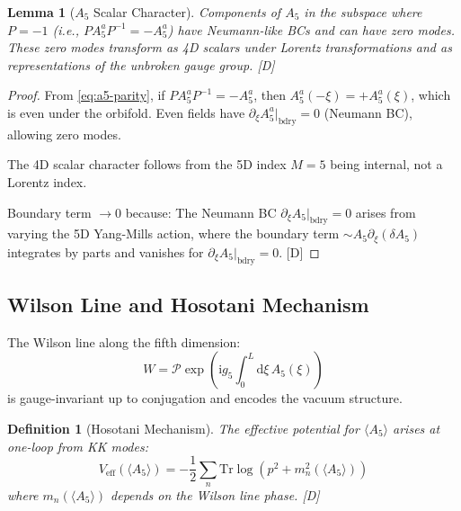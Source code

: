 \documentclass[11pt,a4paper]{article}
\newtheorem{lemma}[theorem]{Lemma}
\newtheorem{definition}[theorem]{Definition}
\newcommand{\Tr}{\mathrm{Tr}}
\newcommand{\dd}{\mathrm{d}}
\newcommand{\ii}{\mathrm{i}}
\begin{document}
\begin{lemma}[$A_5$ Scalar Character]
\label{lem:a5-scalar}
Components of $A_5$ in the subspace where $P = -1$ (i.e., $PA_5^a P^{-1} = -A_5^a$) have
Neumann-like BCs and can have zero modes. These zero modes transform as 4D scalars under
Lorentz transformations and as representations of the unbroken gauge group. [D]
\end{lemma}

\begin{proof}
From \eqref{eq:a5-parity}, if $PA_5^a P^{-1} = -A_5^a$, then $A_5^a(-\xi) = +A_5^a(\xi)$,
which is even under the orbifold. Even fields have $\partial_\xi A_5^a|_{\text{bdry}} = 0$
(Neumann BC), allowing zero modes.

The 4D scalar character follows from the 5D index $M = 5$ being internal, not a Lorentz index.

Boundary term $\to 0$ because: The Neumann BC $\partial_\xi A_5|_{\text{bdry}} = 0$ arises
from varying the 5D Yang-Mills action, where the boundary term $\sim A_5 \partial_\xi(\delta A_5)$
integrates by parts and vanishes for $\partial_\xi A_5|_{\text{bdry}} = 0$. [D]
\end{proof}

\subsection{Wilson Line and Hosotani Mechanism}

The Wilson line along the fifth dimension:
\begin{equation}
W = \mathcal{P} \exp\left(\ii g_5 \int_0^L \dd\xi\, A_5(\xi)\right)
\label{eq:wilson-line}
\end{equation}
is gauge-invariant up to conjugation and encodes the vacuum structure.

\begin{definition}[Hosotani Mechanism]
\label{def:hosotani}
The effective potential for $\langle A_5 \rangle$ arises at one-loop from KK modes:
\begin{equation}
V_{\text{eff}}(\langle A_5 \rangle) = -\frac{1}{2}\sum_n \Tr \log\left(p^2 + m_n^2(\langle A_5 \rangle)\right)
\label{eq:hosotani-potential}
\end{equation}
where $m_n(\langle A_5 \rangle)$ depends on the Wilson line phase. [D]
\end{definition}
\end{document}
